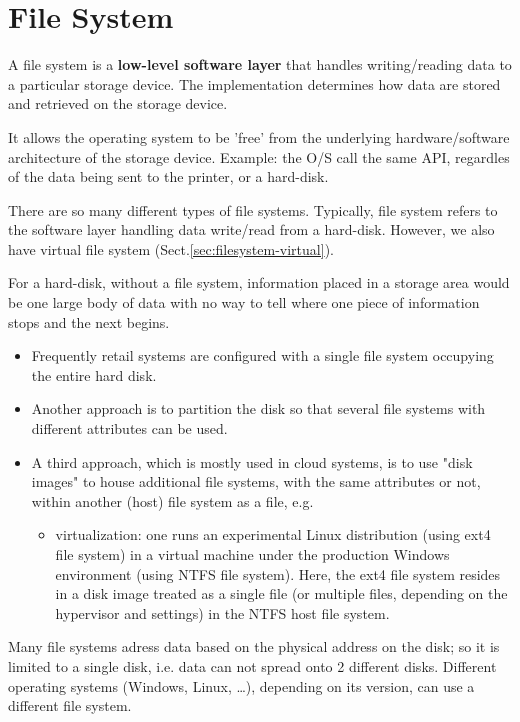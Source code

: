 \section{File System}
\label{sec:file_system}

A file system is a {\bf low-level software layer} that handles writing/reading
data to a particular storage device. The implementation determines how data are
stored and retrieved on the storage device.

It allows the operating system to be 'free' from the underlying
hardware/software architecture of the storage device. Example: the O/S call the
same API, regardles of the data being sent to the printer, or a hard-disk.

There are so many different types of file systems. Typically, file system refers
to the software layer handling data write/read from a hard-disk. However, we
also have virtual file system (Sect.\ref{sec:filesystem-virtual}).

For a hard-disk, without a file system, information placed in a storage area
would be one large body of data with no way to tell where one piece of
information stops and the next begins.
\begin{itemize}
  \item  Frequently retail systems are configured with a single file system
  occupying the entire hard disk. 

  \item Another approach is to partition the disk so that several file
systems with different attributes can be used.

  \item A third approach, which is mostly used in cloud systems, is to use "disk
images" to house additional file systems, with the same attributes or not, within
another (host) file system as a file, e.g. 

\begin{itemize}
  \item virtualization: one runs an experimental Linux distribution (using ext4
  file system) in a virtual machine under the production Windows environment
  (using NTFS file system). Here, the ext4 file system resides in a disk image
  treated as a single file (or multiple files, depending on the hypervisor and
  settings) in the NTFS host file system.
\end{itemize}

\end{itemize}

Many file systems adress data based on the physical address on the disk; so it
is limited to a single disk, i.e. data can not spread onto 2 different disks.
Different operating systems (Windows, Linux, \ldots), depending on its version,
can use a different file system.

